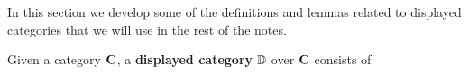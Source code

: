 In this section we develop some of the definitions
and lemmas related to displayed categories that we will use
in the rest of the notes.

\medskip

\begin{definition}
  \label{defn:displayed-category}
   \leanok
  Given a category $\mathbf{C}$, a \textbf{displayed category} $\mathbb{D}$ over $\mathbf{C}$ consists of

\end{definition}
